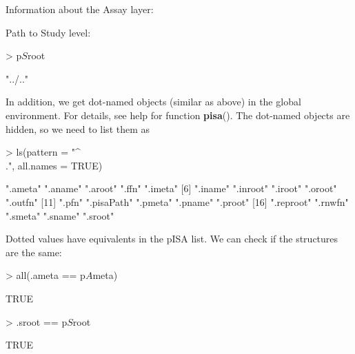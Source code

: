 \documentclass[a4paper,12pt]{article}\usepackage[]{graphicx}\usepackage[]{color}
\providecommand{\fct}[1]{{\ttfamily\textbf{#1}()}}
\begin{document}
Information about the Assay layer:
\begin{Schunk}
\end{Schunk}

Path to Study level:

\begin{Schunk}
\begin{Sinput}
> p$S$root
\end{Sinput}
\begin{Soutput}
[1] "../.."
\end{Soutput}
\end{Schunk}

In addition, we get  dot-named objects (similar as above) in the global environment. For details, see help for function \fct{pisa}. The dot-named objects are hidden, so we need to list them as

\begin{Schunk}
\begin{Sinput}
> ls(pattern = "^\\.", all.names = TRUE)
\end{Sinput}
\begin{Soutput}
 [1] ".ameta"    ".aname"    ".aroot"    ".ffn"      ".imeta"   
 [6] ".iname"    ".inroot"   ".iroot"    ".oroot"    ".outfn"   
[11] ".pfn"      ".pisaPath" ".pmeta"    ".pname"    ".proot"   
[16] ".reproot"  ".rnwfn"    ".smeta"    ".sname"    ".sroot"   
\end{Soutput}
\end{Schunk}

Dotted values have equivalents in the pISA list. We can check if the structures are the same:

\begin{Schunk}
\begin{Sinput}
> all(.ameta == p$A$meta)
\end{Sinput}
\begin{Soutput}
[1] TRUE
\end{Soutput}
\begin{Sinput}
> .sroot == p$S$root
\end{Sinput}
\begin{Soutput}
[1] TRUE
\end{Soutput}
\end{Schunk}
\end{document}
